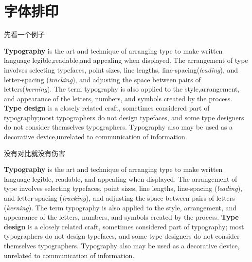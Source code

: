 \section{字体排印}

\begin{frame}{先看一个例子}
\begin{minipage}{\textwidth}
  \SimHei\small
  \linespread{0.8}\selectfont
  \textbf{Typography} is the art and technique of arranging type to make written language
  legible,readable,and appealing when displayed. The arrangement of type involves selecting
  typefaces, point sizes, line lengths, line-spacing(\textit{leading}), and letter-spacing
  (\textit{tracking}), and adjusting the space between pairs of letters(\textit{kerning}).
  The term typography is also applied to the style,arrangement, and appearance of the letters,
  numbers, and symbols created by the process. \textbf{Type design} is a closely related craft,
  sometimes considered part of typography;most typographers do not design typefaces, and some
  type designers do not consider themselves typographers. Typography also may be used as a
  decorative device,unrelated to communication of information.
\end{minipage}
\end{frame}

\begin{frame}{没有对比就没有伤害}
\begin{minipage}{\textwidth}
  \EBGaramond\small
  \textbf{Typography} is the art and technique of arranging type to make written language
  legible, readable, and appealing when displayed. The arrangement of type involves selecting
  typefaces, point sizes, line lengths, line-spacing (\textit{leading}), and letter-spacing
  (\textit{tracking}), and adjusting the space between pairs of letters (\textit{kerning}).
  The term typography is also applied to the style, arrangement, and appearance of the letters,
  numbers, and symbols created by the process. \textbf{Type design} is a closely related craft,
  sometimes considered part of typography; most typographers do not design typefaces, and some
  type designers do not consider themselves typographers. Typography also may be used as a
  decorative device, unrelated to communication of information.
\end{minipage}
\end{frame}

